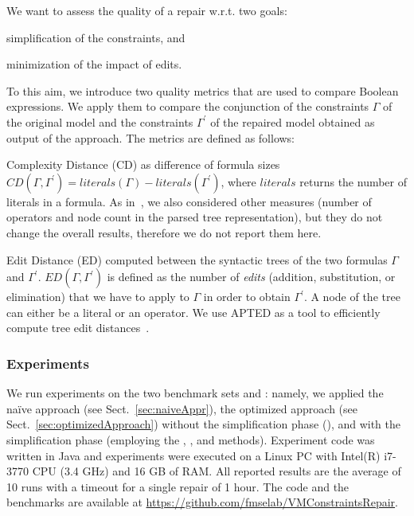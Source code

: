 \begin{tikzborder}{\cite{Gargantini16:validation}}
\begin{tikzborder}{\cite{gargantini_combinatorial_2017}}
\begin{tikzborder}{\cite{gargantini_combinatorial_2017}}
\begin{tikzborder}{\cite{garn2019}}
\begin{tikzborder}{\cite{arcaini2019achieving}}
\begin{tikzborder}{\cite{arcaini2019varivolution}}
		\bb We want to assess the quality of a repair w.r.t. two goals:
		\begin{inparaenum}[(i)]
			\item simplification of the constraints, and
			\item minimization of the impact of edits.
		\end{inparaenum}
		To this aim, we introduce two quality metrics that are used to compare Boolean expressions. We apply them to compare the conjunction of the constraints $\Gamma$ of the original model \m and the constraints $\Gamma^\prime$ of the repaired model \mRep obtained as output of the approach. The metrics are defined as follows:
		\begin{compactitem}
			\item{Complexity Distance (\textsf{CD})} as difference of formula sizes $\mathit{CD}(\Gamma, \Gamma^\prime) = \mathit{literals}(\Gamma) - \mathit{literals}(\Gamma^\prime)$, where $\mathit{literals}$ returns the number of literals in a formula. As in~\cite{vonRhein2015}, we also considered other measures (number of operators and node count in the parsed tree representation), but they do not change the overall results, therefore we do not report them here.
			\item {Edit Distance (\textsf{ED})} computed between the syntactic trees of the two formulas $\Gamma$ and $\Gamma^\prime$. $\mathit{ED}(\Gamma, \Gamma^\prime)$ is defined as the number of {\it edits} (addition, substitution, or elimination) that we have to apply to $\Gamma$ in order to obtain $\Gamma^\prime$. A node of the tree can either be a literal or an operator. We use \textsf{APTED} as a tool to efficiently compute tree edit distances~\cite{pawlik_tree_2016}.
		\end{compactitem}
		\be
		
		\subsubsection{Experiments}\label{sec:evaluation}
		
		\bb We run experiments on the two benchmark sets \benchMut and \benchReal: namely, we applied the na{\"i}ve approach (see Sect.~\ref{sec:naiveAppr}), the optimized approach (see Sect.~\ref{sec:optimizedApproach}) without the \textsf{simplification} phase (\textsf{\onlySelection}), and with the \textsf{simplification} phase (employing the \atgt, \espresso, \jbool and \qm methods). Experiment code was written in Java and experiments were executed on a Linux PC with Intel(R) i7-3770 CPU (3.4 GHz) and 16 GB of RAM. All reported results are the average of 10 runs with a timeout for a single repair of 1 hour. The code and the benchmarks are available at \url{https://github.com/fmselab/VMConstraintsRepair}.
		

\end{tikzborder}
\end{tikzborder}
\end{tikzborder}
\end{tikzborder}
\end{tikzborder}
\end{tikzborder}
